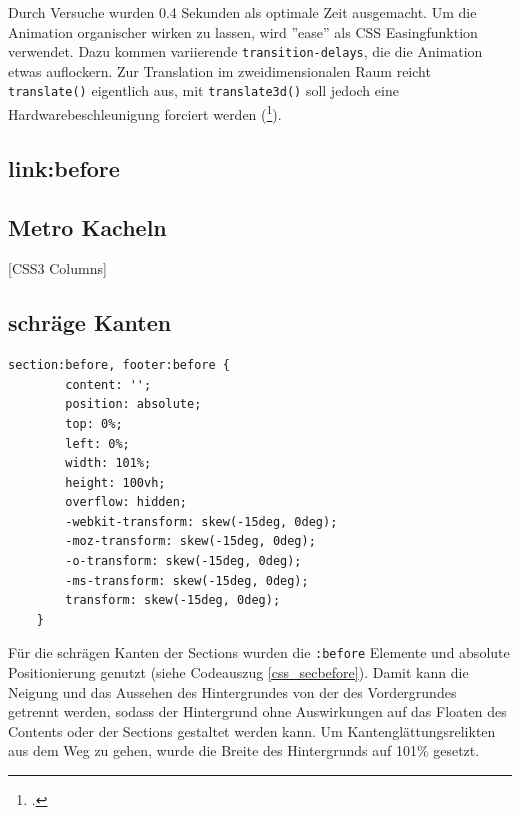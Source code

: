 Durch Versuche wurden 0.4 Sekunden als optimale Zeit ausgemacht. Um die Animation organischer wirken zu lassen, wird ''ease'' als CSS Easingfunktion verwendet. Dazu kommen variierende \lstinline{transition-delays}, die die Animation etwas auflockern.
Zur Translation im zweidimensionalen Raum reicht \lstinline{translate()} eigentlich aus, mit \lstinline{translate3d()} soll jedoch eine Hardwarebeschleunigung forciert werden (\footcite[vgl.][]{css3D}).

\subsection{link:before}

\subsection{Metro Kacheln}
[CSS3 Columns]
\subsection{schräge Kanten}
\begin{lstlisting}[caption=Der Hintergrund der Section als Container., label=css_secbefore]
section:before, footer:before {
        content: '';
        position: absolute;
        top: 0%;
        left: 0%;
        width: 101%;
        height: 100vh;
        overflow: hidden;
        -webkit-transform: skew(-15deg, 0deg);
        -moz-transform: skew(-15deg, 0deg);
        -o-transform: skew(-15deg, 0deg);
        -ms-transform: skew(-15deg, 0deg);
        transform: skew(-15deg, 0deg);
    }
\end{lstlisting}

Für die schrägen Kanten der Sections wurden die \lstinline{:before} Elemente und absolute Positionierung genutzt (siehe Codeauszug \ref{css_secbefore}). Damit kann die Neigung und das Aussehen des Hintergrundes von der des Vordergrundes getrennt werden, sodass der Hintergrund ohne Auswirkungen auf das Floaten des Contents oder der Sections gestaltet werden kann. Um Kantenglättungsrelikten aus dem Weg zu gehen, wurde die Breite des Hintergrunds auf 101\% gesetzt.
